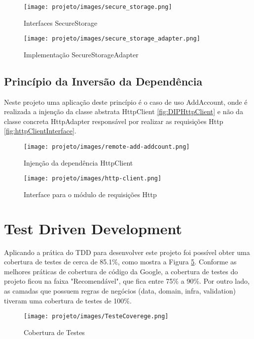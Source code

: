 \documentclass[12pt]{article}
\begin{document}
\begin{appendices}
\begin{figure}[!ht]
  \centering
  \texttt{[image: projeto/images/secure\_storage.png]}
  \caption{Interfaces SecureStorage}
  \label{fig:SecureStorageInterfaces}
\end{figure}

\begin{figure}[!ht]
  \centering
  \texttt{[image: projeto/images/secure\_storage\_adapter.png]}
  \caption{Implementação SecureStorageAdapter}
  \label{fig:SecureStorageAdapter}
\end{figure}

\subsection{Princípio da Inversão da Dependência}
Neste projeto uma aplicação deste princípio é o caso de uso AddAccount, onde é realizada a injenção da classe abstrata HttpClient \autoref{fig:DIPHttpClient} e não da classe concreta HttpAdapter responsável por realizar as requisições Http \autoref{fig:httpClientInterface}.

\begin{figure}[ht]
  \centering
  \texttt{[image: projeto/images/remote-add-addcount.png]}
  \caption{Injenção da dependência HttpClient}
  \label{fig:DIPHttpClient}
\end{figure}

\begin{figure}[ht]
  \centering
  \texttt{[image: projeto/images/http-client.png]}
  \caption{Interface para o módulo de requisições Http}
  \label{fig:httpClientInterface}
\end{figure}

\section{Test Driven Development}
\label{apx:tdd}
Aplicando a prática do TDD para desenvolver este projeto foi possível obter uma cobertura de testes de cerca de 85.1\%, como mostra a Figura \ref{fig:testeCoverage}. Conforme as melhores práticas de cobertura de código da Google, \cite{codeCoverage} a cobertura de testes do projeto ficou na faixa "Recomendável", que fica entre 75\% a 90\%. Por outro lado, as camadas que possuem regras de negócios (data, domain, infra, validation) tiveram uma cobertura de testes de 100\%.

\begin{figure}[ht]
  \centering
  \texttt{[image: projeto/images/TesteCoverege.png]}
  \caption{Cobertura de Testes}
  \label{fig:testeCoverage}
\end{figure}

\end{appendices}
\end{document}
